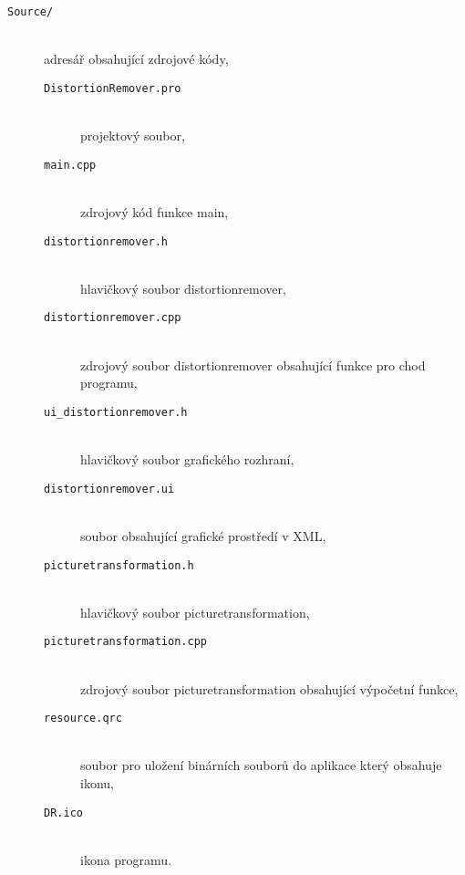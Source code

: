 \begin{description}
\begin{description}
            	\item[\tt Source/] ~ \\ adresář obsahující zdrojové kódy,
            	\begin{description}
            			\item[\tt DistortionRemover.pro] ~ \\ projektový soubor,
            			\item[\tt main.cpp] ~ \\ zdrojový kód funkce main,
            			\item[\tt distortionremover.h] ~ \\ hlavičkový soubor distortionremover,
            			\item[\tt distortionremover.cpp] ~ \\ zdrojový soubor distortionremover obsahující funkce pro chod programu,
            			\item[\tt ui\_distortionremover.h] ~ \\ hlavičkový soubor grafického rozhraní,
            			\item[\tt distortionremover.ui] ~ \\ soubor obsahující grafické prostředí v XML,
            			\item[\tt picturetransformation.h] ~ \\ hlavičkový soubor picturetransformation,
            			\item[\tt picturetransformation.cpp] ~ \\ zdrojový soubor picturetransformation obsahující výpočetní funkce,
            			\item[\tt resource.qrc] ~ \\ soubor pro uložení binárních souborů do aplikace který obsahuje ikonu,
            			\item[\tt DR.ico] ~ \\ ikona programu.

            	\end{description}
        \end{description}
    \end{description}

